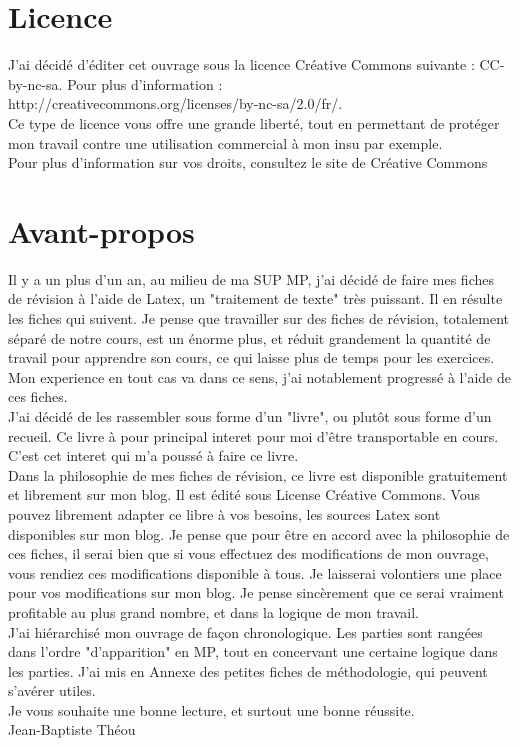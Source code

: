 \documentclass[a4paper, titlepage,twoside]{book}
\begin{document}
\pagestyle{empty}
\titleGMPHY
\clearpage
\frontmatter                  %
\chapter{Licence}
J'ai décidé d'éditer cet ouvrage sous la licence Créative Commons suivante : CC-by-nc-sa. Pour plus d'information :\\
http://creativecommons.org/licenses/by-nc-sa/2.0/fr/.\\
Ce type de licence vous offre une grande liberté, tout en permettant de protéger mon travail contre une utilisation commercial à mon insu par exemple.\\
Pour plus d'information sur vos droits, consultez le site de Créative Commons
\chapter{Avant-propos}
Il y a un plus d'un an, au milieu de ma SUP MP, j'ai décidé de faire mes fiches de révision à l'aide de Latex, un "traitement de texte" très puissant. Il en résulte les fiches qui suivent. Je pense que travailler sur des fiches de révision, totalement séparé de notre cours, est un énorme plus, et réduit grandement la quantité de travail pour apprendre son cours, ce qui laisse plus de temps pour les exercices. Mon experience en tout cas va dans ce sens, j'ai notablement progressé à l'aide de ces fiches.\\
J'ai décidé de les rassembler sous forme d'un "livre", ou plutôt sous forme d'un recueil. Ce livre à pour principal interet pour moi d'être transportable en cours. C'est cet interet qui m'a poussé à faire ce livre.\\
Dans la philosophie de mes fiches de révision, ce livre est disponible gratuitement et librement sur mon blog. Il est édité sous License Créative Commons. Vous pouvez librement adapter ce libre à vos besoins, les sources Latex sont disponibles sur mon blog. Je pense que pour être en accord avec la philosophie de ces fiches, il serai bien que si vous effectuez des modifications de mon ouvrage, vous rendiez ces modifications disponible à tous. Je laisserai volontiers une place pour vos modifications sur mon blog. Je pense sincèrement que ce serai vraiment profitable au plus grand nombre, et dans la logique de mon travail.\\
J'ai hiérarchisé mon ouvrage de façon chronologique. Les parties sont rangées dans l'ordre "d'apparition" en MP, tout en concervant une certaine logique dans les parties. J'ai mis en Annexe des petites fiches de méthodologie, qui peuvent s'avérer utiles.\\
Je vous souhaite une bonne lecture, et surtout une bonne réussite.\\
Jean-Baptiste Théou
\end{document}
